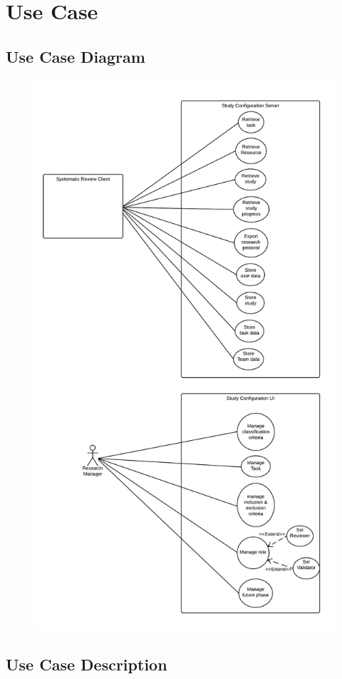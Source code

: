 \section{Use Case}
\subsection{Use Case Diagram}
\begin{figure}[H]
  \includegraphics[width = 31 em]{section/UseCaseDiagram_Autosys}
  \label{fig:Use Case 1}
\end{figure}

\subsection{Use Case Description}



